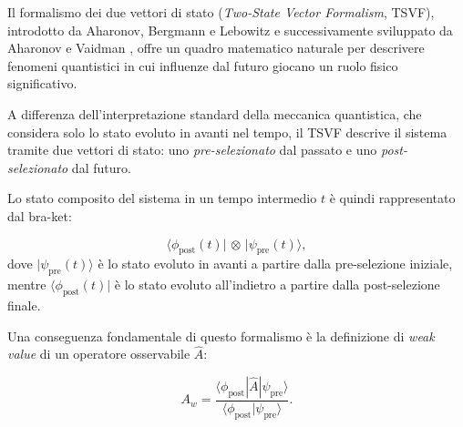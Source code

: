 \documentclass[11pt,a4paper]{article}
\let\oldcite\cite
\renewcommand{\cite}{\protect\oldcite}
\theoremstyle{plain}
\theoremstyle{definition}
\begin{document}
\vspace{0.2cm}

Il formalismo dei due vettori di stato (\emph{Two-State Vector Formalism}, TSVF), introdotto da Aharonov, Bergmann e Lebowitz \cite{aharonov_tsvf_1964} e successivamente sviluppato da Aharonov e Vaidman \cite{vaidman_tsvf_2007}, offre un quadro matematico naturale per descrivere fenomeni quantistici in cui influenze dal futuro giocano un ruolo fisico significativo. 


\vspace{0.5cm}


A differenza dell’interpretazione standard della meccanica quantistica, che considera solo lo stato evoluto in avanti nel tempo, il TSVF descrive il sistema tramite due vettori di stato: uno \emph{pre-selezionato} dal passato e uno \emph{post-selezionato} dal futuro.

\vspace{0.3cm}

Lo stato composito del sistema in un tempo intermedio $t$ è quindi rappresentato dal bra-ket:


\vspace{0.4cm}

\begin{tcolorbox}[colback=blue!3!white, colframe=blue!80!black, title={\textbf{Composizione Two-State Vector (TSVF)}}, sharp corners, boxrule=0.9pt, coltitle=white]
\begin{equation}
\langle \phi_{\text{post}}(t) | \, \otimes \, | \psi_{\text{pre}}(t) \rangle,
\label{eq:two_state_vector}
\end{equation}
dove $|\psi_{\text{pre}}(t)\rangle$ è lo stato evoluto in avanti a partire dalla pre-selezione iniziale, mentre $\langle \phi_{\text{post}}(t)|$ è lo stato evoluto all’indietro a partire dalla post-selezione finale.
\end{tcolorbox}

\clearpage

Una conseguenza fondamentale di questo formalismo è la definizione di \emph{weak value} di un operatore osservabile $\hat{A}$:

\vspace{0.2cm}

\begin{equation}
A_w = \frac{\langle \phi_{\text{post}} | \hat{A} | \psi_{\text{pre}} \rangle}{\langle \phi_{\text{post}} | \psi_{\text{pre}} \rangle}.
\label{eq:weak_value}
\end{equation}
\end{document}

